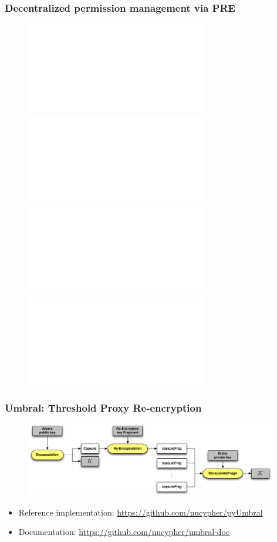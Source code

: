 \documentclass[xetex,mathsans,sans,aspectratio=169]{beamer}
\begin{document}
    \begin{frame}
        \frametitle{Decentralized permission management via PRE}
        \begin{figure}
            \centering
            \includegraphics<1>[height=0.6\textheight]{pdf/delegate.pdf}\includegraphics<2>[height=0.6\textheight]{pdf/encrypt.pdf}\includegraphics<3>[height=0.6\textheight]{pdf/decrypt.pdf}\includegraphics<4>[height=0.6\textheight]{pdf/pre-kms.pdf}
        \end{figure}
    \end{frame}

    \begin{frame}
        \frametitle{Umbral: Threshold Proxy Re-encryption}
        \begin{figure}
            \centering
            \includegraphics[width=11cm]{pdf/umbral-kem-flow.pdf}
        \end{figure}
        \begin{itemize}
            \item Reference implementation: \url{https://github.com/nucypher/pyUmbral}
            \item Documentation: \url{https://github.com/nucypher/umbral-doc}
        \end{itemize}
    \end{frame}
\end{document}
